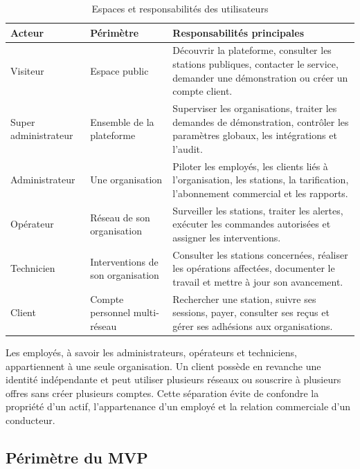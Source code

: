 \begin{table}[H]
  \centering
  \caption{Espaces et responsabilités des utilisateurs}
  \label{tab:role-spaces}
  \small
  \renewcommand{\arraystretch}{1.22}
  \begin{tabularx}{\textwidth}{|C{2.65cm}|C{3.2cm}|Y|}
    \hline
    \textbf{Acteur} & \textbf{Périmètre} & \textbf{Responsabilités principales}\\
    \hline
    Visiteur
    & Espace public
    & Découvrir la plateforme, consulter les stations publiques, contacter le service,
    demander une démonstration ou créer un compte client.\\
    \hline
    Super administrateur
    & Ensemble de la plateforme
    & Superviser les organisations, traiter les demandes de démonstration, contrôler
    les paramètres globaux, les intégrations et l'audit.\\
    \hline
    Administrateur
    & Une organisation
    & Piloter les employés, les clients liés à l'organisation, les stations, la
    tarification, l'abonnement commercial et les rapports.\\
    \hline
    Opérateur
    & Réseau de son organisation
    & Surveiller les stations, traiter les alertes, exécuter les commandes autorisées
    et assigner les interventions.\\
    \hline
    Technicien
    & Interventions de son organisation
    & Consulter les stations concernées, réaliser les opérations affectées, documenter
    le travail et mettre à jour son avancement.\\
    \hline
    Client
    & Compte personnel multi-réseau
    & Rechercher une station, suivre ses sessions, payer, consulter ses reçus et gérer
    ses adhésions aux organisations.\\
    \hline
  \end{tabularx}
\end{table}

Les employés, à savoir les administrateurs, opérateurs et techniciens, appartiennent
à une seule organisation. Un client possède en revanche une identité indépendante et
peut utiliser plusieurs réseaux ou souscrire à plusieurs offres sans créer plusieurs
comptes. Cette séparation évite de confondre la propriété d'un actif, l'appartenance
d'un employé et la relation commerciale d'un conducteur.

\subsection{Périmètre du MVP}

